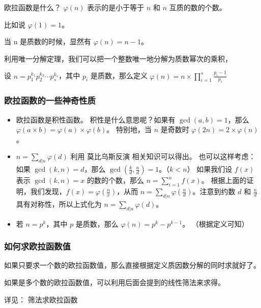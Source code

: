
欧拉函数是什么？ $\varphi(n)$ 表示的是小于等于 $n$ 和 $n$ 互质的数的个数。

比如说 $\varphi(1) = 1$。

当 n 是质数的时候，显然有 $\varphi(n) = n - 1$。

利用唯一分解定理，我们可以把一个整数唯一地分解为质数幂次的乘积，

设 $n = p_1^{k_1}p_2^{k_2} \cdots p_s^{k_s}$，其中 $p_i$ 是质数，那么定义 $\varphi(n) = n \times \prod_{i = 1}^s{\frac{p_i - 1}{p_i}}$

\subsubsection{欧拉函数的一些神奇性质}

\begin{itemize}
\item 欧拉函数是积性函数。
  积性是什么意思呢？如果有 $\gcd(a, b) = 1$，那么 $\varphi(a \times b) = \varphi(a) \times \varphi(b)$。
  特别地，当 $n$ 是奇数时 $\varphi(2n) = 2 \times \varphi(n)$。
\item $n = \sum_{d | n}{\varphi(d)}$
  利用  莫比乌斯反演  相关知识可以得出。
  也可以这样考虑：如果 $\gcd(k, n) = d$，那么 $\gcd(\frac{k}{d},\frac{n}{d}) = 1$。（$k < n$）
  如果我们设 $f(x)$ 表示 $\gcd(k, n) = x$ 的数的个数，那么 $n = \sum_{i = 1}^n{f(x)}$。
  根据上面的证明，我们发现，$f(x) = \varphi(\frac{n}{x})$，从而 $n = \sum_{d | n}\varphi(\frac{n}{d})$。注意到约数 $d$ 和 $\frac{n}{d}$ 具有对称性，所以上式化为 $n = \sum_{d | n}\varphi(d)$。
\item 若 $n = p^k$，其中 $p$ 是质数，那么 $\varphi(n) = p^k - p^{k - 1}$。
  （根据定义可知）
\end{itemize}

\subsubsection{如何求欧拉函数值}

如果只要求一个数的欧拉函数值，那么直接根据定义质因数分解的同时求就好了。


如果是多个数的欧拉函数值，可以利用后面会提到的线性筛法来求得。

详见： 筛法求欧拉函数 
